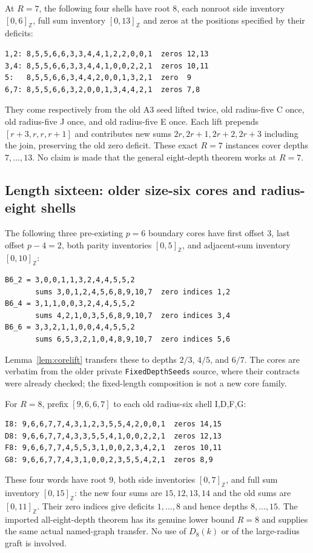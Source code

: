 \documentclass[11pt,a4paper]{article}
\theoremstyle{definition}\newtheorem{definition}[theorem]{Definition}
\theoremstyle{remark}\newtheorem{remark}[theorem]{Remark}
\newcommand{\ints}[2]{[#1,#2]_{\mathbb Z}}
\begin{document}
At $R=7$, the following four shells have root $8$, each nonroot side
inventory $\ints06$, full sum inventory $\ints0{13}$ and zeros at
the positions specified by their deficits:
\begin{verbatim}
1,2: 8,5,5,6,6,3,3,4,4,1,2,2,0,0,1  zeros 12,13
3,4: 8,5,5,6,6,3,3,4,4,1,0,0,2,2,1  zeros 10,11
5:   8,5,5,6,6,3,4,4,2,0,0,1,3,2,1  zero  9
6,7: 8,5,5,6,6,3,2,0,0,1,3,4,4,2,1  zeros 7,8
\end{verbatim}
They come respectively from the old A3 seed lifted twice, old
radius-five C once, old radius-five J once, and old radius-five E
once. Each lift prepends $[r+3,r,r,r+1]$ and contributes new sums
$2r,2r+1,2r+2,2r+3$ including the join, preserving the old zero
deficit. These exact $R=7$ instances cover depths $7,\ldots,13$.
No claim is made that the general eight-depth theorem works at $R=7$.

\subsection{Length sixteen: older size-six cores and radius-eight shells}
The following three pre-existing $p=6$ boundary cores have first
offset $3$, last offset $p-4=2$, both parity inventories $\ints05$,
and adjacent-sum inventory $\ints0{10}$:
\begin{verbatim}
B6_2 = 3,0,0,1,1,3,2,4,4,5,5,2
       sums 3,0,1,2,4,5,6,8,9,10,7  zero indices 1,2
B6_4 = 3,1,1,0,0,3,2,4,4,5,5,2
       sums 4,2,1,0,3,5,6,8,9,10,7  zero indices 3,4
B6_6 = 3,3,2,1,1,0,0,4,4,5,5,2
       sums 6,5,3,2,1,0,4,8,9,10,7  zero indices 5,6
\end{verbatim}
Lemma~\ref{lem:corelift} transfers these to depths $2/3$, $4/5$,
and $6/7$. The cores are verbatim from the older private
\texttt{FixedDepthSeeds} source, where their contracts were already
checked; the fixed-length composition is not a new core family.

For $R=8$, prefix $[9,6,6,7]$ to each old radius-six shell I,D,F,G:
\begin{verbatim}
I8: 9,6,6,7,7,4,3,1,2,3,5,5,4,2,0,0,1  zeros 14,15
D8: 9,6,6,7,7,4,3,3,5,5,4,1,0,0,2,2,1  zeros 12,13
F8: 9,6,6,7,7,4,5,5,3,1,0,0,2,3,4,2,1  zeros 10,11
G8: 9,6,6,7,7,4,3,1,0,0,2,3,5,5,4,2,1  zeros 8,9
\end{verbatim}
These four words have root $9$, both side inventories $\ints07$,
and full sum inventory $\ints0{15}$: the new four sums are
$15,12,13,14$ and the old sums are $\ints0{11}$. Their zero
indices give deficits $1,\ldots,8$ and hence depths $8,\ldots,15$.
The imported all-eight-depth theorem has its genuine lower bound
$R=8$ and supplies the same actual named-graph transfer. No use of
$D_8(k)$ or of the large-radius graft is involved.
\end{document}
